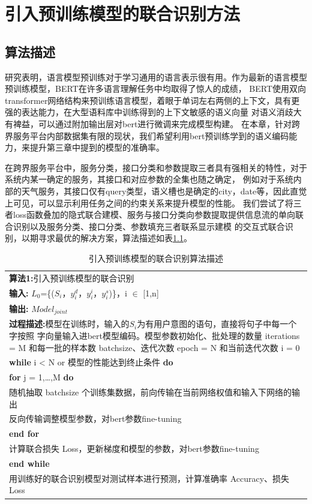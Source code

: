 \chapter{引入预训练模型的联合识别方法}

\section{算法描述}
研究表明，语言模型预训练对于学习通用的语言表示很有用。作为最新的语言模型预训练模型，BERT在许多语言理解任务中均取得了惊人的成绩，
BERT使用双向transformer网络结构来预训练语言模型，着眼于单词左右两侧的上下文，具有更强的表达能力，在大型语料库中训练得到的上下文敏感的语义向量
对语义消歧大有裨益，可以通过附加输出层对bert进行微调来完成模型构建。
在本章，针对跨界服务平台内部数据集有限的现状，我们希望利用bert预训练学到的语义编码能力，来提升第三章中提到的模型的准确率。

在跨界服务平台中，服务分类，接口分类和参数提取三者具有强相关的特性，对于系统内某一确定的服务，其接口和对应参数的全集也随之确定，
例如对于系统内部的天气服务，其接口仅有query类型，语义槽也是确定的city，date等，因此直觉上可见，可以显示利用任务之间的约束关系来提升模型的性能。
我们尝试了将三者loss函数叠加的隐式联合建模、服务与接口分类向参数提取提供信息流的单向联合识别以及服务分类、接口分类、参数填充三者联系显示建模
的交互式联合识别，以期寻求最优的解决方案，算法描述如表\ref{tab:suanfa2}。

\begin{table}[htb]
  \centering
  \caption{引入预训练模型的联合识别算法描述}
  \label{tab:suanfa2}
\begin{tabular}{p{150mm}}
\toprule
\textbf{算法1:}引入预训练模型的联合识别\\
\textbf{输入:} $L_0$=\{($S_i$，$y_i^d$，$y_i^i$，$y_i^s$)\}，i $\in$ [1,n]\\
\textbf{输出:} $Model_{joint}$\\
\hline
\textbf{过程描述:}模型在训练时，输入的$S_i$为有用户意图的语句，直接将句子中每一个字按照
字向量输入进bert模型编码。模型参数初始化、批处理的数量
iterations = M 和每一批的样本数 batchsize、迭代次数 epoch = N 和当前迭代次数 i = 0\\
\textbf{while} i < N or 模型的性能达到终止条件 \textbf{do}\\
\qquad \qquad \textbf{for} j = 1,\dots ,M \textbf{do}\\
\qquad \qquad \qquad \qquad 随机抽取 batchsize 个训练集数据，前向传输在当前网络权值和输入下网络的输出\\
\qquad \qquad \qquad \qquad 反向传输调整模型参数，对bert参数fine-tuning\\
\qquad \qquad \textbf{end for}\\
\qquad \qquad 计算联合损失 Loss，更新梯度和模型的参数，对bert参数fine-tuning\\
\textbf{end while}\\
用训练好的联合识别模型对测试样本进行预测，计算准确率 Accuracy、损失 Loss\\
\bottomrule
\end{tabular}
\end{table}

